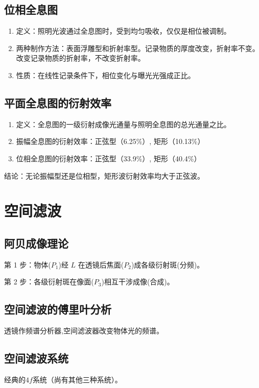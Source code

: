 \documentclass[twocolumn]{ctexart}
\begin{document}
\subsection{位相全息图}
\begin{enumerate}
    \item 定义：照明光波通过全息图时，受到均匀吸收，仅仅是相位被调制。
    \item 两种制作方法：表面浮雕型和折射率型。记录物质的厚度改变，折射率不变。改变记录物质的折射率，不改变折射率。
    \item 性质：在线性记录条件下，相位变化与曝光光强成正比。
\end{enumerate}

\subsection{平面全息图的衍射效率}
\begin{enumerate}
    \item 定义：全息图的一级衍射成像光通量与照明全息图的总光通量之比。
    \item 振幅全息图的衍射效率：正弦型（6.25\%）, 矩形（10.13\%）
    \item 位相全息图的衍射效率：正弦型（33.9\%）, 矩形（40.4\%）
\end{enumerate}
结论：无论振幅型还是位相型，矩形波衍射效率均大于正弦波。

\section{空间滤波}
\subsection{阿贝成像理论}
第 1 步：物体($P_1$)经 $L$ 在透镜后焦面($P_2$)成各级衍射斑(分频)。\par
第 2 步：各级衍射斑在像面($P_3$)相互干涉成像(合成)。
\subsection{空间滤波的傅里叶分析}
透镜作频谱分析器,空间滤波器改变物体光的频谱。
\subsection{空间滤波系统}
经典的$4f$系统（尚有其他三种系统）。
\end{document}
